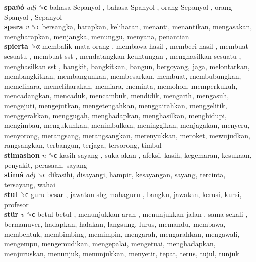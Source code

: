 \textbf{spañó} \emph{adj}  ␝ϲ   bahasa Sepanyol ,  bahasa Spanyol ,  orang Sepanyol ,  orang Spanyol ,  Sepanyol   \\
\textbf{spera} \emph{v}  ␝ϲ  bersangka, harapkan, kelihatan, menanti, menantikan, mengasakan, mengharapkan, menjangka, menunggu, menyana, penantian  \\
\textbf{spierta} ␝α   membalik mata orang ,  membawa hasil ,  memberi hasil ,  membuat sesuatu ,  membuat sst ,  mendatangkan keuntungan ,  menghasilkan sesuatu ,  menghasilkan sst , bangkit, bangkitkan, bangun, bergoyang, jaga, melontarkan, membangkitkan, membangunkan, membesarkan, membuat, membubungkan, memelihara, memeliharakan, memiara, meminta, memohon, memperkukuh, mencadangkan, mencaduk, mencambuk, mendidik, mengarih, mengasuh, mengejuti, mengejutkan, mengetengahkan, menggairahkan, menggelitik, menggerakkan, menggugah, menghadapkan, menghasilkan, menghidupi, mengimbau, mengukuhkan, menimbulkan, meninggikan, menjagakan, menyeru, menyorong, merangsang, merangsangkan, merenyukkan, meroket, mewujudkan, rangsangkan, terbangun, terjaga, tersorong, timbul  \\
\textbf{stimashon} \emph{n}  ␝ϲ   kasih sayang ,  suka akan , afeksi, kasih, kegemaran, kesukaan, penyakit, perasaan, sayang  \\
\textbf{stimá} \emph{adj}  ␝ϲ  dikasihi, disayangi, hampir, kesayangan, sayang, tercinta, tersayang, wahai  \\
\textbf{stul} ␝ϲ   guru besar ,  jawatan sbg mahaguru , bangku, jawatan, kerusi, kursi, profesor  \\
\textbf{stür} \emph{v}  ␝ϲ   betul-betul ,  menunjukkan arah ,  menunjukkan jalan ,  sama sekali , bermanuver, hadapkan, halakan, langsung, lurus, memandu, membawa, membentuk, membimbing, memimpin, mengarah, mengarahkan, mengawali, mengempu, mengemudikan, mengepalai, mengetuai, menghadapkan, menjuruskan, menunjuk, menunjukkan, menyetir, tepat, terus, tujul, tunjuk  \\
